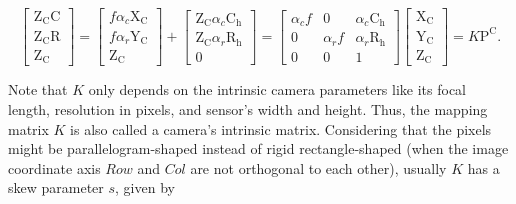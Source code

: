 \begin{equation}
\left[ \begin{array}{c} \text{Z}_\text{C} \text{C} \\ \text{Z}_\text{C} \text{R} \\ \text{Z}_\text{C}  \end{array} \right] %
= %
\left[ \begin{array}{c} f\alpha_c\text{X}_\text{C} \\ f\alpha_r\text{Y}_\text{C} \\ \text{Z}_\text{C} \end{array} \right]%
+
\left[ \begin{array}{c}  \text{Z}_\text{C}\alpha_c\text{C}_\text{h} \\ \text{Z}_\text{C}\alpha_r\text{R}_\text{h} \\ 0 \end{array} \right] %
=  \begin{bmatrix} \alpha_cf & 0 &  \alpha_c\text{C}_\text{h}  \\ 0 & \alpha_rf & \alpha_r\text{R}_\text{h} \\ 0 & 0 & 1 \end{bmatrix}%
\left[ \begin{array}{c} \text{X}_\text{C} \\ \text{Y}_\text{C} \\ \text{Z}_\text{C} \end{array} \right]%
= K\text{P}^\text{C}  .
\label{HomoProportionalFromCamToImInPixels}
\end{equation}%

\noindent
Note that \(K\) only depends on the intrinsic camera parameters like its focal length, resolution in pixels, and sensor's width and height. Thus, the mapping matrix \(K\) is also called a camera's intrinsic matrix. Considering that the pixels might be parallelogram-shaped instead of rigid rectangle-shaped (when the image coordinate axis \(Row\) and \(Col\) are not orthogonal to each other), usually \(K\) has a skew parameter \(s\), given by

